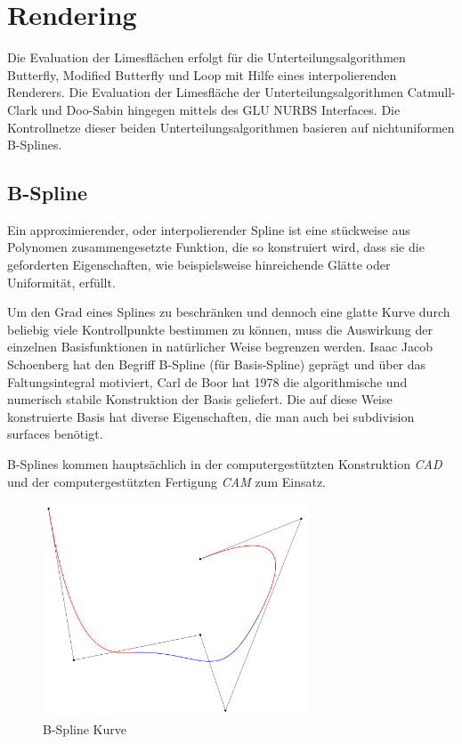 \section{Rendering} \label{sec:rendering}
Die Evaluation der Limesflächen erfolgt für die Unterteilungsalgorithmen Butterfly, Modified Butterfly und Loop mit Hilfe eines interpolierenden Renderers.
Die Evaluation der Limesfläche der Unterteilungsalgorithmen Catmull-Clark und Doo-Sabin hingegen mittels des GLU NURBS Interfaces.
Die Kontrollnetze dieser beiden Unterteilungsalgorithmen basieren auf nichtuniformen B-Splines.

\subsection{B-Spline}
Ein approximierender, oder interpolierender Spline ist eine stückweise aus Polynomen zusammengesetzte Funktion, die so konstruiert wird, dass sie die geforderten Eigenschaften, wie beispielsweise hinreichende Glätte oder Uniformität, erfüllt.

Um den Grad eines Splines zu beschränken und dennoch eine glatte Kurve durch beliebig viele Kontrollpunkte bestimmen zu können, muss die Auswirkung der einzelnen Basisfunktionen in natürlicher Weise begrenzen werden.
Isaac Jacob Schoenberg hat den Begriff B-Spline (für Basis-Spline) geprägt und über das Faltungsintegral motiviert, Carl de Boor hat 1978 die algorithmische und numerisch stabile Konstruktion der Basis geliefert.
Die auf diese Weise konstruierte Basis hat diverse Eigenschaften, die man auch bei subdivision surfaces benötigt. \cite{kroemker:2008}

B-Splines kommen hauptsächlich in der computergestützten Konstruktion \textit{CAD} und der computergestützten Fertigung \textit{CAM} zum Einsatz.

\begin{figure}[h]
  \centering
  \includegraphics[width=0.7\textwidth]{content/media/b-spline_curve.png}
  \caption{B-Spline Kurve}
  \label{fig:b-spline}
\end{figure}

